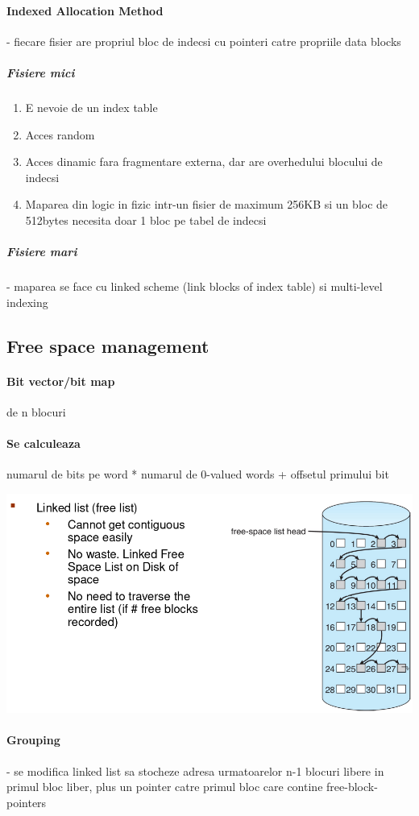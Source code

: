 \documentclass{article}
\begin{document}
\paragraph*{Indexed Allocation Method} - fiecare fisier are propriul bloc de indecsi cu pointeri catre propriile data blocks
\subparagraph*{Fisiere mici}
\begin{enumerate}
    \item E nevoie de un index table
    \item Acces random
    \item Acces dinamic fara fragmentare externa, dar are overhedului blocului de indecsi
    \item Maparea din logic in fizic intr-un fisier de maximum 256KB si un bloc de 512bytes necesita doar 1 bloc pe tabel de indecsi
\end{enumerate}
\subparagraph*{Fisiere mari} - maparea se face cu linked scheme (link blocks of index table) si multi-level indexing

\subsection*{Free space management}
\paragraph*{Bit vector/bit map} de n blocuri
\paragraph*{Se calculeaza} numarul de bits pe word * numarul de 0-valued words + offsetul primului bit
\begin{center}
    \includegraphics[scale=0.4]{49-linkedfreespacelist.png}
\end{center}

\paragraph*{Grouping} - se modifica linked list sa stocheze adresa urmatoarelor n-1 blocuri libere in primul bloc liber, plus un pointer catre primul bloc care contine free-block-pointers
\end{document}
